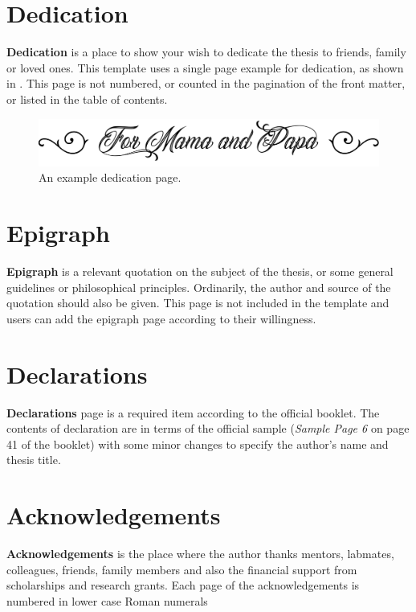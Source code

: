 \section{Dedication}
\label{chap2:sec2:dedication}
\textbf{Dedication} is a place to show your wish to dedicate the thesis to friends, family or loved ones. This template uses a single page example for dedication, as shown in . This page is not numbered, or counted in the pagination of the front matter, or listed in the table of contents.
\begin{figure}
    \centering
    \includegraphics[width=.6\textwidth]{Dedication/dedication.pdf}
    \caption{An example dedication page.}
    \label{fig:chap2:dedication_sample}
\end{figure}


\section{Epigraph}
\label{chap2:sec3:epigraph}
\textbf{Epigraph} is a relevant quotation on the subject of the thesis, or some general guidelines or philosophical principles. Ordinarily, the author and source of the quotation should also be given. This page is not included in the template and users can add the epigraph page according to their willingness.


\section{Declarations}
\label{chap2:sec4:declarations}
\textbf{Declarations} page is a required item according to the official booklet. The contents of declaration are in terms of the official sample (\textit{Sample Page 6} on page 41 of the booklet) with some minor changes to specify the author's name and thesis title.


\section{Acknowledgements}
\label{chap2:sec5:acknowledgements}
\textbf{Acknowledgements} is the place where the author thanks mentors, labmates, colleagues, friends, family members and also the financial support from scholarships and research grants. Each page of the acknowledgements is numbered in lower case Roman numerals


